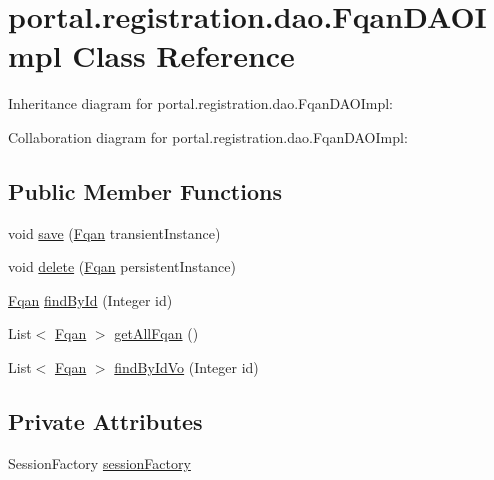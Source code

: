 \hypertarget{classportal_1_1registration_1_1dao_1_1FqanDAOImpl}{
\section{portal.registration.dao.FqanDAOImpl Class Reference}
\label{classportal_1_1registration_1_1dao_1_1FqanDAOImpl}
}


Inheritance diagram for portal.registration.dao.FqanDAOImpl:


Collaboration diagram for portal.registration.dao.FqanDAOImpl:
\subsection*{Public Member Functions}
\begin{DoxyCompactItemize}
\item 
void \hyperlink{classportal_1_1registration_1_1dao_1_1FqanDAOImpl_af429f668a38b68a4f166954266d57af0}{save} (\hyperlink{classportal_1_1registration_1_1domain_1_1Fqan}{Fqan} transientInstance)
\item 
void \hyperlink{classportal_1_1registration_1_1dao_1_1FqanDAOImpl_aff1a784a03f00607e55ef7a8e6f473a6}{delete} (\hyperlink{classportal_1_1registration_1_1domain_1_1Fqan}{Fqan} persistentInstance)
\item 
\hyperlink{classportal_1_1registration_1_1domain_1_1Fqan}{Fqan} \hyperlink{classportal_1_1registration_1_1dao_1_1FqanDAOImpl_a75fd10c1a58647de38eb10af28b74cd4}{findById} (Integer id)
\item 
List$<$ \hyperlink{classportal_1_1registration_1_1domain_1_1Fqan}{Fqan} $>$ \hyperlink{classportal_1_1registration_1_1dao_1_1FqanDAOImpl_aa0701c8920f8222dfd73f3c6fccc35d0}{getAllFqan} ()
\item 
List$<$ \hyperlink{classportal_1_1registration_1_1domain_1_1Fqan}{Fqan} $>$ \hyperlink{classportal_1_1registration_1_1dao_1_1FqanDAOImpl_a09f9108798b2af4c9903cc6f70f1110f}{findByIdVo} (Integer id)
\end{DoxyCompactItemize}
\subsection*{Private Attributes}
\begin{DoxyCompactItemize}
\item 
SessionFactory \hyperlink{classportal_1_1registration_1_1dao_1_1FqanDAOImpl_a0cff64d972eb00b9796b06c5141d5807}{sessionFactory}
\end{DoxyCompactItemize}
